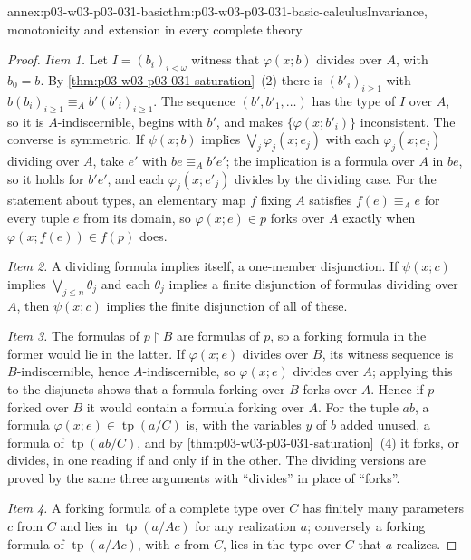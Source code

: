 \begin{annexitem}{annex:p03-w03-p03-031-basic}{thm:p03-w03-p03-031-basic-calculus}{Invariance, monotonicity and extension in every complete theory}
\begin{proof}
\emph{Item 1.}  Let \(I=(b_i)_{i<\omega}\) witness that \(\varphi(x;b)\)
divides over \(A\), with \(b_0=b\).  By
\cref{thm:p03-w03-p03-031-saturation}~(2) there is \((b'_i)_{i\geq1}\) with
\(b(b_i)_{i\geq1}\equiv_Ab'(b'_i)_{i\geq1}\).  The sequence
\((b',b'_1,\ldots)\) has the type of \(I\) over \(A\), so it is
\(A\)-indiscernible, begins with \(b'\), and makes
\(\{\varphi(x;b'_i)\}\) inconsistent.  The converse is symmetric.  If
\(\psi(x;b)\) implies \(\bigvee_j\varphi_j(x;e_j)\) with each
\(\varphi_j(x;e_j)\) dividing over \(A\), take \(e'\) with
\(be\equiv_Ab'e'\); the implication is a formula over \(A\) in \(be\), so
it holds for \(b'e'\), and each \(\varphi_j(x;e'_j)\) divides by the
dividing case.  For the statement about types, an elementary map \(f\)
fixing \(A\) satisfies \(f(e)\equiv_Ae\) for every tuple \(e\) from its
domain, so \(\varphi(x;e)\in p\) forks over \(A\) exactly when
\(\varphi(x;f(e))\in f(p)\) does.

\emph{Item 2.}  A dividing formula implies itself, a one-member
disjunction.  If \(\psi(x;c)\) implies \(\bigvee_{j\leq n}\theta_j\) and
each \(\theta_j\) implies a finite disjunction of formulas dividing over
\(A\), then \(\psi(x;c)\) implies the finite disjunction of all of these.

\emph{Item 3.}  The formulas of \(p\mathbin{\upharpoonright}B\) are formulas
of \(p\), so a forking formula in the former would lie in the latter.  If
\(\varphi(x;e)\) divides over \(B\), its witness sequence is
\(B\)-indiscernible, hence \(A\)-indiscernible, so \(\varphi(x;e)\) divides
over \(A\); applying this to the disjuncts shows that a formula forking over
\(B\) forks over \(A\).  Hence if \(p\) forked over \(B\) it would contain a
formula forking over \(A\).  For the tuple \(ab\), a formula
\(\varphi(x;e)\in\operatorname{tp}(a/C)\) is, with the variables \(y\) of
\(b\) added unused, a formula of \(\operatorname{tp}(ab/C)\), and by
\cref{thm:p03-w03-p03-031-saturation}~(4) it forks, or divides, in one
reading if and only if in the other.  The dividing versions are proved by
the same three arguments with ``divides'' in place of ``forks''.

\emph{Item 4.}  A forking formula of a complete type over \(C\) has finitely
many parameters \(c\) from \(C\) and lies in
\(\operatorname{tp}(a/Ac)\) for any realization \(a\); conversely a forking
formula of \(\operatorname{tp}(a/Ac)\), with \(c\) from \(C\), lies in the
type over \(C\) that \(a\) realizes.


\end{proof}
\end{annexitem}
